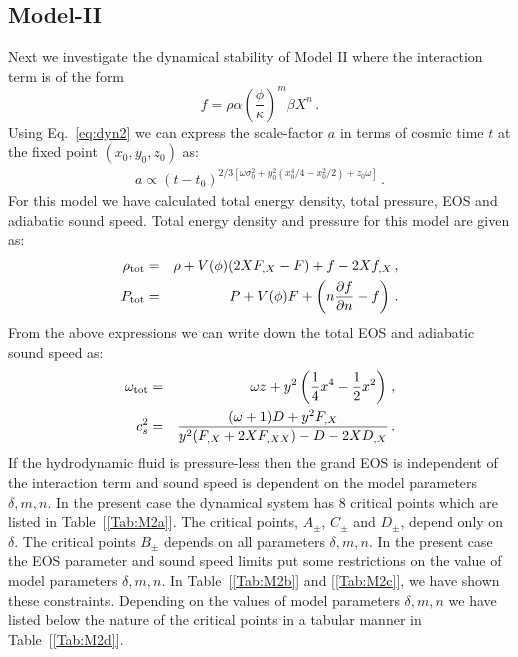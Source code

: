 \documentclass[a4paper,12pt]{article}
\newcommand{\p}{\ensuremath{\partial{}}}
\begin{document}
\subsection{Model-II}
	
Next we investigate the dynamical stability of Model II where the interaction term
is of the form
$$f = \rho \alpha \left(\dfrac{\phi}{\kappa}\right)^m \beta X^n\,. $$
Using Eq.~\eqref{eq:dyn2} we can express the scale-factor $a$ in terms of cosmic time $t$ at the fixed point $(x_{0},y_{0},z_{0})$ as:
%
\begin{eqnarray}
a \propto (t-t_{0})^{2/3[\omega \sigma_{0}^2 +y_{0}^2(x_{0}^4/4-x_{0}^2/2) +z_{0}\omega]}\,.
\label{eq:M2-a}
\end{eqnarray}  
%
For this model we have calculated total energy density, total pressure, EOS and adiabatic sound speed. Total energy density and pressure for this model are given as:
% 
\begin{eqnarray}
\rho_{\rm tot} &=& \rho + V(\phi) (2XF_{,X}-F) + f-2Xf_{,X}\,,   \nonumber\\
P_{\rm tot} &=& P + V(\phi)F + \left(n\dfrac{\p f}{\p n} -f \right)\,. 
\label{eq:M2-b}
\end{eqnarray}
%
From the above expressions we can write down the total EOS and adiabatic sound speed as:
%
\begin{eqnarray}
\omega_{\rm tot}	&=& \omega z + y^2\left(\frac14 x^4-\frac12 x^2\right)\,, \nonumber\\
c_s^2 &=& \dfrac{(\omega+1)D+y^2 F_{,X} }{y^2(F_{,X} + 2XF_{,XX}) - D -2XD_{,X}}\,. 
\label{eq:M2-c}
\end{eqnarray}
%
If the hydrodynamic fluid is pressure-less then the grand EOS is independent of the interaction term and sound speed is dependent on the model parameters $\delta,m,n$. In the present case the dynamical system has $8$ critical points which are listed in Table~[\ref{Tab:M2a}]. The critical points, $A_{\pm}$, $C_\pm$ and $D_\pm$, depend only on  $\delta$. The critical points $B_{\pm}$ depends on all  parameters $\delta, m, n$. In the present case the EOS parameter and sound speed limits put some restrictions on the value of model parameters $\delta,m,n$. In Table~[\ref{Tab:M2b}] and [\ref{Tab:M2c}], we have shown these constraints. Depending on the values of model parameters $\delta,m,n$ we have listed below the nature of the critical points in a tabular manner in Table~[\ref{Tab:M2d}].	  
\end{document}
